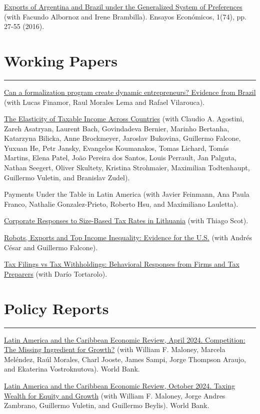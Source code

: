 \documentclass[a4paper,11pt]{article}
\newcommand{\sectitle}[1]{
    \vspace{1.5ex}
    \section{#1}
    \vspace{-2.5ex}
    \noindent\rule{\textwidth}{0.5pt}
    \vspace{-4ex}
}
\begin{document}
\href{https://pablogarriga.github.io/files/sgp.pdf}{Exports of Argentina and Brazil under the Generalized System of Preferences}
(with Facundo Albornoz and Irene Brambilla). Ensayos Económicos, 1(74), pp. 27-55 (2016).
\sectitle{Working Papers}

\href{https://pablogarriga.github.io/files/entrepreneurs-bra.pdf}{Can a formalization program create dynamic entrepreneurs? Evidence from Brazil}
(with Lucas Finamor, Raul Morales Lema and Rafael Vilarouca).

\href{https://pablogarriga.github.io/files/entrepreneurs-bra.pdf}{The Elasticity of Taxable Income Across Countries}
(with Claudio A. Agostini, Zareh Asatryan, Laurent Bach, Govindadeva Bernier, Marinho Bertanha, Katarzyna Bilicka, Anne Brockmeyer, Jaroslav Bukovina, Guillermo Falcone, Yuxuan He, Petr Jansky, Evangelos Koumanakos, Tomas Lichard, Tomás Martins, Elena Patel, João Pereira dos Santos, Louis Perrault, Jan Palguta, Nathan Seegert, Oliver Skultety, Kristina Strohmaier, Maximilian Todtenhaupt, Guillermo Vuletin, and Branislav Zudel).

Payments Under the Table in Latin America
(with Javier Feinmann, Ana Paula Franco, Nathalie Gonzalez-Prieto, Roberto Hsu, and Maximiliano Lauletta).

\href{https://documents.worldbank.org/en/publication/documents-reports/documentdetail/099313106262317603/idu0e3c1b6c300a6c045390bb860c3c2931a384f}{Corporate Responses to Size-Based Tax Rates in Lithuania}
(with Thiago Scot).

\href{https://www.cedlas.econo.unlp.edu.ar/wp/en/no-307/}{Robots, Exports and Top Income Inequality: Evidence for the U.S.}
(with Andrés César and Guillermo Falcone).

\href{https://pablogarriga.github.io/files/tax-preparers.pdf}{Tax Filings vs Tax Withholdings: Behavioral Responses from Firms and Tax Preparers}
(with Darío Tortarolo).

\sectitle{Policy Reports}

\href{https://hdl.handle.net/10986/41230}{Latin America and the Caribbean Economic Review, April 2024. Competition: The Missing Ingredient for Growth?}
(with William F. Maloney, Marcela Meléndez, Raúl Morales, Charl Jooste, James Sampi, Jorge Thompson Araujo, and Ekaterina Vostroknutova). World Bank.

\href{https://hdl.handle.net/10986/42001}{Latin America and the Caribbean Economic Review, October 2024. Taxing Wealth for Equity and Growth}
(with William F. Maloney, Jorge Andres Zambrano, Guillermo Vuletin, and Guillermo Beylis). World Bank.
\end{document}
